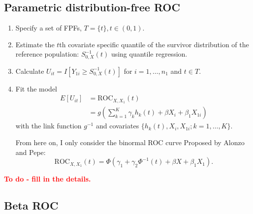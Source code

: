\documentclass{article}
\newcommand{\ga}{\gamma}
\newcommand{\be}{\beta}
\renewcommand{\l}{\left}
\renewcommand{\r}{\right}
\begin{document}
\subsection{Parametric distribution-free ROC}

\begin{enumerate}
    \item Specify a set of FPFs, $T = \{t\}, t \in (0,1)$.
    \item Estimate the $t$th covariate specific quantile of the survivor distribution of the reference population: $S_{0, X}^{-1}(t)$ using quantile regression.
    \item Calculate $U_{it} = I\l[Y_{1i} \geq S_{0, X}^{-1}(t)\r]$ for $i = 1, \dots, n_1$ and $t \in T$.
    \item Fit the model 
    \begin{align*}
        E[U_{it}] &= \text{ROC}_{X, X_1}(t) \\
            &= g\l(\sum_{k=1}^K \ga_kh_k(t) + \be X_i + \be_1 X_{1i}\r)
    \end{align*} with the link function $g^{-1}$ and covariates $\{h_k(t), X_i, X_{1i}; k = 1, \dots, K\}$.
    
    From here on, I only consider the binormal ROC curve {\color{blue} Proposed by Alonzo and Pepe}:
    $$\text{ROC}_{X, X_1}(t) = \Phi\l(\ga_1 + \ga_2\Phi^{-1}(t) + \be X + \be_1 X_1 \r).$$
\end{enumerate}

\textcolor{red}{\textbf{To do - fill in the details.}}

\subsection{Beta ROC}
\end{document}
